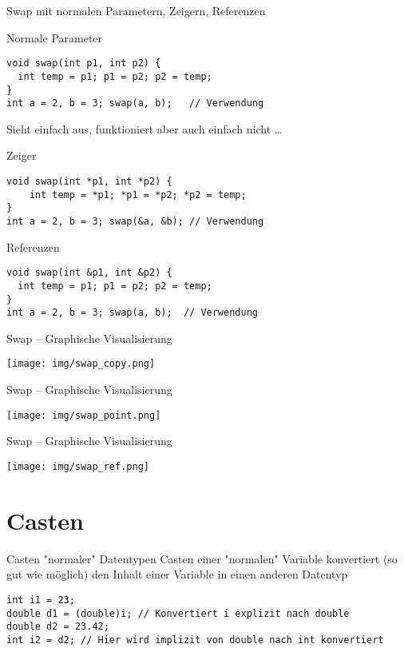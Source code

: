 \documentclass[presentation]{beamer}
\begin{document}
\begin{frame}[label={sec:org7676784},fragile]{Swap mit normalen Parametern, Zeigern, Referenzen}
 \begin{block}{Normale Parameter}
\begin{verbatim}
void swap(int p1, int p2) {
  int temp = p1; p1 = p2; p2 = temp;
}
int a = 2, b = 3; swap(a, b);   // Verwendung
\end{verbatim}
\footnotesize
Sieht einfach aus, funktioniert aber auch einfach nicht \ldots{}
\end{block}
\begin{block}{Zeiger}
\begin{verbatim}
void swap(int *p1, int *p2) {
    int temp = *p1; *p1 = *p2; *p2 = temp;
}
int a = 2, b = 3; swap(&a, &b); // Verwendung
\end{verbatim}
\end{block}
\begin{block}{Referenzen}
\begin{verbatim}
void swap(int &p1, int &p2) {
  int temp = p1; p1 = p2; p2 = temp;
}
int a = 2, b = 3; swap(a, b);  // Verwendung
\end{verbatim}
\end{block}
\end{frame}
\begin{frame}[label={sec:org6c3d990}]{Swap -- Graphische Visualisierung}
\begin{center}
\texttt{[image: img/swap\_copy.png]}
\end{center}
\end{frame}
\begin{frame}[label={sec:org03f5846}]{Swap -- Graphische Visualisierung}
\begin{center}
\texttt{[image: img/swap\_point.png]}
\end{center}
\end{frame}
\begin{frame}[label={sec:orge1390b5}]{Swap -- Graphische Visualisierung}
\begin{center}
\texttt{[image: img/swap\_ref.png]}
\end{center}
\end{frame}
\section{Casten}
\label{sec:orgff6fa73}
\begin{frame}[label={sec:orgbeb0e11},fragile]{Casten "normaler" Datentypen}
 Casten einer "normalen" Variable konvertiert (so gut wie möglich) den
Inhalt einer Variable in einen anderen Datentyp
\begin{verbatim}
int i1 = 23;
double d1 = (double)i; // Konvertiert i explizit nach double
double d2 = 23.42;
int i2 = d2; // Hier wird implizit von double nach int konvertiert
\end{verbatim}
\end{frame}
\end{document}
